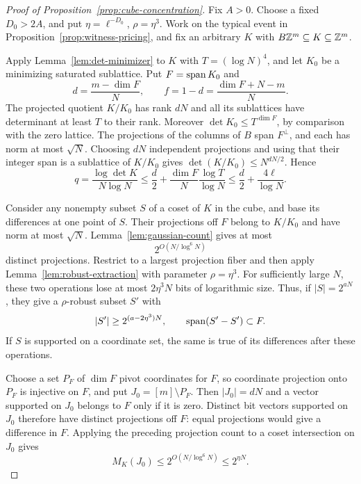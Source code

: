 \begin{proof}[Proof of Proposition~\ref{prop:cube-concentration}]
Fix \(A>0\). Choose a fixed \(D_0>2A\), and put
\(\eta=\ell^{-D_0}\), \(\rho=\eta^3\). Work on the
typical event in Proposition~\ref{prop:witness-pricing}, and fix an
arbitrary \(K\) with \(B\mathbb Z^m\subseteq K\subseteq\mathbb Z^m\).

Apply Lemma~\ref{lem:det-minimizer} to \(K\) with
\(T=(\log N)^4\), and let \(K_0\) be a minimizing saturated sublattice.
Put \(F=\operatorname{span} K_0\) and
\[
 d=\frac{m-\dim F}{N},\qquad
 f=1-d=\frac{\dim F+N-m}{N}.
\]
The projected quotient \(K/K_0\) has rank \(dN\) and all its
sublattices have determinant at least \(T\) to their rank. Moreover
\(\det K_0\le T^{\dim F}\), by comparison with the zero lattice.
The projections of the columns of \(B\) span \(F^\perp\), and each
has norm at most \(\sqrt N\). Choosing \(dN\) independent projections
and using that their integer span is a sublattice of \(K/K_0\) gives
\(\det(K/K_0)\le N^{dN/2}\). Hence
\begin{equation}\label{eq:cube-order-dimension}
 q=\frac{\log\det K}{N\log N}
 \le \frac d2+\frac{\dim F}{N}\frac{\log T}{\log N}
 \le \frac d2+\frac{4\ell}{\log N}.
\end{equation}

Consider any nonempty subset \(S\) of a coset of \(K\) in the cube, and base
its differences at one point of \(S\). Their projections off \(F\)
belong to \(K/K_0\) and have norm at most \(\sqrt N\).
Lemma~\ref{lem:gaussian-count} gives at most
\[
 2^{O(N/\log^6N)}
\]
distinct projections. Restrict to a largest projection fiber and
then apply Lemma~\ref{lem:robust-extraction} with parameter
\(\rho=\eta^3\). For sufficiently large \(N\), these two operations
lose at most \(2\eta^3N\) bits of logarithmic size. Thus, if
\(|S|=2^{aN}\), they give a \(\rho\)-robust subset \(S'\) with
\begin{equation}\label{eq:cube-fiber-extraction}
 |S'|\ge2^{(a-2\eta^3)N},
 \qquad \operatorname{span}(S'-S')\subset F.
\end{equation}
If \(S\) is supported on a coordinate set, the same is true of its
differences after these operations.

Choose a set \(P_F\) of \(\dim F\) pivot coordinates for \(F\), so
coordinate projection onto \(P_F\) is injective on \(F\), and put
\(J_0=[m]\setminus P_F\). Then \(|J_0|=dN\) and a vector supported on
\(J_0\) belongs to \(F\) only if it is zero. Distinct bit vectors
supported on \(J_0\) therefore have distinct projections off \(F\):
equal projections would give a difference in \(F\). Applying the
preceding projection count to a coset intersection on \(J_0\) gives
\begin{equation}\label{eq:cube-pivot-complement}
 M_K(J_0)\le2^{O(N/\log^6N)}\le2^{\eta N}.
\end{equation}


\end{proof}
